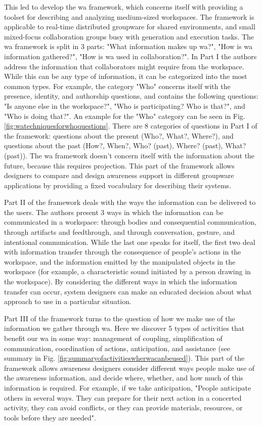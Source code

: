 This led \cite{gutwin_descriptive_2002} to develop the \gls{wa} framework, which concerns itself with providing a toolset for describing and analyzing medium-sized workspaces. The framework is applicable to real-time distributed groupware for shared environments, and small mixed-focus collaboration groups busy with generation and execution tasks.
The \gls{wa} framework is split in 3 parts: "What information makes up \gls{wa}?", "How is \gls{wa} information gathered?", "How is \gls{wa} used in collaboration?". 
In Part I the authors address the information that collaborators might require from the workspace. While this can be any type of information, it can be categorized into the most common types. For example, the category "Who" concerns itself with the presence, identity, and authorship questions, and contains the following questions: "Is anyone else in the workspace?", "Who is participating? Who is that?", and "Who is doing that?". An example for the "Who" category can be seen in Fig. \ref{fig:watechniquesforwhoquestions}. There are 8 categories of questions in Part I of the framework: questions about the present (Who?, What?, Where?), and questions about the past (How?, When?, Who? (past), Where? (past), What? (past)). The \gls{wa} framework doesn't concern itself with the information about the future, because this requires projection.
This part of the framework allows designers to compare and design awareness support in different groupware applications by providing a fixed vocabulary for describing their systems.

Part II of the framework deals with the ways the information can be delivered to the users. The authors present 3 ways in which the information can be communicated in a workspace: through bodies and consequential communication, through artifacts and feedthrough, and through conversation, gesture, and intentional communication. While the last one speaks for itself, the first two deal with information transfer through the consequence of people's actions in the workspace, and the information emitted by the manipulated objects in the workspace (for example, a characteristic sound initiated by a person drawing in the workspace).
By considering the different ways in which the information transfer can occur, system designers can make an educated decision about what approach to use in a particular situation.

Part III of the framework turns to the question of how we make use of the information we gather through \gls{wa}. Here we discover 5 types of activities that benefit our \gls{wa} in some way: management of coupling, simplification of communication, coordination of actions, anticipation, and assistance (see summary in Fig. \ref{fig:summaryofactivitieswherwacanbeused}).
This part of the framework allows awareness designers consider different ways people make use of the awareness information, and decide where, whether, and how much of this information is required.
For example, if we take anticipation, "People anticipate others in several ways. They can prepare for their next action in a concerted activity, they can avoid conflicts, or they can provide materials, resources, or tools before they are needed".


